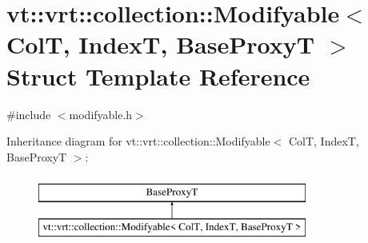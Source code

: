 \hypertarget{structvt_1_1vrt_1_1collection_1_1_modifyable}{}\section{vt\+:\+:vrt\+:\+:collection\+:\+:Modifyable$<$ ColT, IndexT, Base\+ProxyT $>$ Struct Template Reference}
\label{structvt_1_1vrt_1_1collection_1_1_modifyable}


{\ttfamily \#include $<$modifyable.\+h$>$}

Inheritance diagram for vt\+:\+:vrt\+:\+:collection\+:\+:Modifyable$<$ ColT, IndexT, Base\+ProxyT $>$\+:\begin{figure}[H]
\begin{center}
\leavevmode
\includegraphics[height=2.000000cm]{structvt_1_1vrt_1_1collection_1_1_modifyable}
\end{center}
\end{figure}
